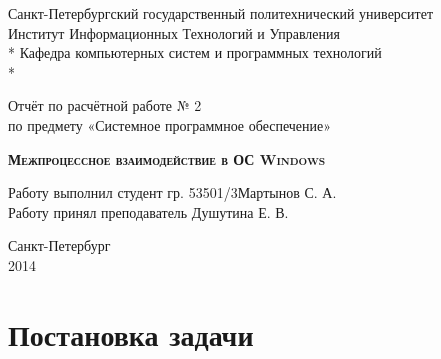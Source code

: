 \documentclass[a4paper, 12pt]{report}		%
\begin{document}
\begin{titlepage}
\thispagestyle{empty}

\begin{center}
Санкт-Петербургский государственный политехнический университет \\
Институт Информационных Технологий и Управления \\*
Кафедра компьютерных систем и программных технологий \\*
\hrulefill
\end{center}

\vspace{18em}

\begin{center}
\Large Отчёт по расчётной работе № 2 \\ по предмету «Системное программное обеспечение» \\
\end{center}

\vspace{1em}

\begin{center}
\textsc{\textbf{Межпроцессное взаимодействие в ОС Windows}}
\end{center}

\vspace{16em}

\begin{flushleft}
Работу выполнил студент гр. 53501/3\hrulefill Мартынов С. А. \\
\vspace{1.5em}
Работу принял преподаватель \hrulefill Душутина Е. В. \\
\end{flushleft}

\vspace{\fill}

\begin{center}
Санкт-Петербург \\
2014
\end{center}

\end{titlepage}
\setcounter{page}{2}
\tableofcontents

\chapter*{Постановка задачи}
\end{document}
